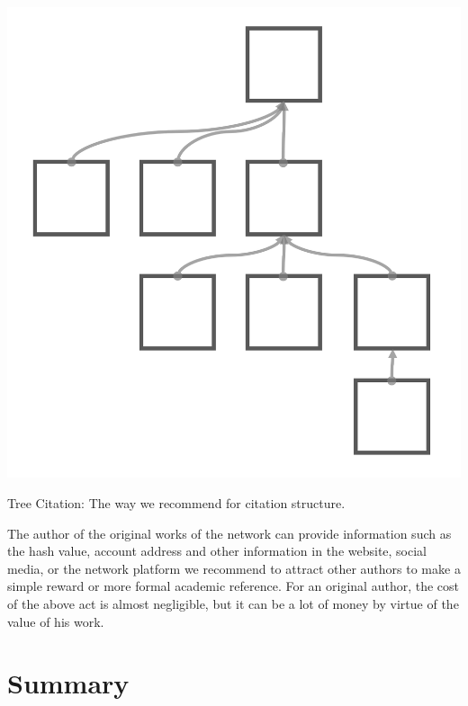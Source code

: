 \documentclass[a4paper,oneside,openany]{tufte-book}
\begin{document}
\begin{marginfigure}
  \includegraphics[width=\textwidth]{fig/treeC.png}
  \caption{Tree Citation: The way we recommend for citation structure. }
\end{marginfigure}

The author of the original works of the network can provide information such as the hash value, account address and other information in the website, social media, or the network platform we recommend to attract other authors to make a simple reward or more formal academic reference. For an original author, the cost of the above act is almost negligible, but it can be a lot of money by virtue of the value of his work.














\chapter{Summary}
\end{document}
